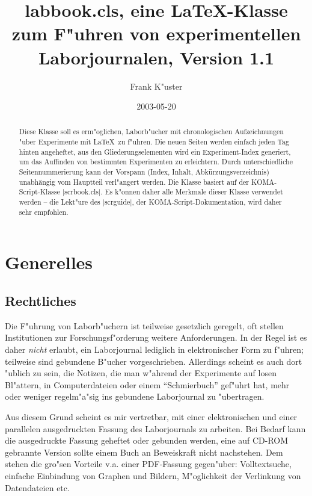 \documentclass[a4paper]{article}
\begin{document}
\title{labbook.cls, eine \LaTeX-Klasse zum F"uhren von experimentellen
  Laborjournalen, Version 1.1}

\author{Frank K"uster}
\date{2003-05-20}
\maketitle

\begin{abstract}
  Diese Klasse soll es erm"oglichen, Laborb"ucher mit chronologischen
  Aufzeichnungen "uber Experimente mit \LaTeX\ zu f"uhren. Die neuen
  Seiten werden einfach jeden Tag hinten angeheftet, aus den
  Gliederungselementen wird ein Experiment-Index generiert, um das
  Auffinden von bestimmten Experimenten zu erleichtern. Durch
  unterschiedliche Seitennummerierung kann der Vorspann (Index,
  Inhalt, Abk^^fcrzungsverzeichnis) unabh^^e4ngig vom Hauptteil verl"angert
  werden.  Die Klasse basiert auf der KOMA-Script-Klasse
  |scrbook.cls|. Es k"onnen daher alle Merkmale dieser Klasse
  verwendet werden -- die Lekt"ure des |scrguide|, der
  KOMA-Script-Dokumentation, wird daher sehr empfohlen.
\end{abstract}

\tableofcontents

\section{Generelles}

\subsection{Rechtliches}

Die F"uhrung von Laborb"uchern ist teilweise gesetzlich geregelt, oft
stellen Institutionen zur Forschungsf"orderung weitere Anforderungen.
In der Regel ist es daher \emph{nicht} erlaubt, ein Laborjournal
lediglich in elektronischer Form zu f"uhren; teilweise sind gebundene
B"ucher vorgeschrieben. Allerdings scheint es auch dort "ublich zu
sein, die Notizen, die man w"ahrend der Experimente auf losen
Bl"attern, in Computerdateien oder einem "`Schmierbuch"' gef"uhrt hat,
mehr oder weniger regelm"a"sig ins gebundene Laborjournal zu
"ubertragen.

Aus diesem Grund scheint es mir vertretbar, mit einer elektronischen
und einer parallelen ausgedruckten Fassung des Laborjournals zu
arbeiten. Bei Bedarf kann die ausgedruckte Fassung geheftet oder
gebunden werden, eine auf CD-ROM gebrannte Version sollte einem Buch
an Beweiskraft nicht nachstehen. Dem stehen die gro"sen Vorteile v.a. einer
PDF-Fassung gegen"uber: Volltextsuche, einfache Einbindung von
Graphen und Bildern, M"oglichkeit der Verlinkung von Datendateien etc.
\end{document}
